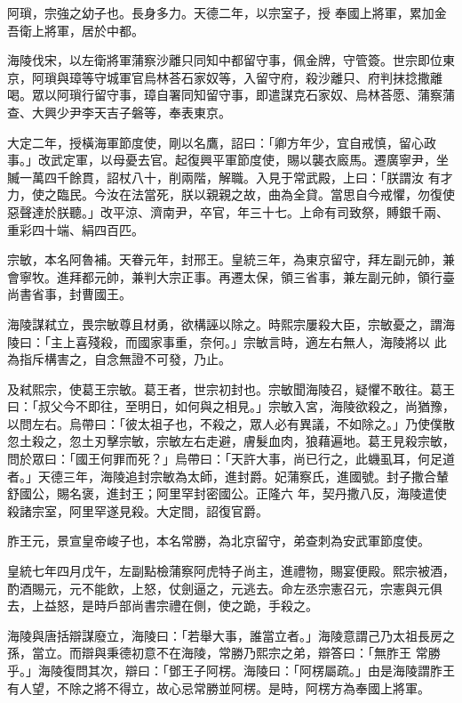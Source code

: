 \begin{pinyinscope}
 阿瑣，宗強之幼子也。長身多力。天德二年，以宗室子，授
 奉國上將軍，累加金吾衛上將軍，居於中都。



 海陵伐宋，以左衛將軍蒲察沙離只同知中都留守事，佩金牌，守管簽。世宗即位東京，阿瑣與璋等守城軍官烏林荅石家奴等，入留守府，殺沙離只、府判抹捻撒離喝。眾以阿瑣行留守事，璋自署同知留守事，即遣謀克石家奴、烏林荅愿、蒲察蒲查、大興少尹李天吉子磐等，奉表東京。



 大定二年，授橫海軍節度使，剛以名鷹，詔曰：「卿方年少，宜自戒慎，留心政事。」改武定軍，以母憂去官。起復興平軍節度使，賜以襲衣廄馬。遷廣寧尹，坐贓一萬四千餘貫，詔杖八十，削兩階，解職。入見于常武殿，上曰：「朕謂汝
 有才力，使之臨民。今汝在法當死，朕以親親之故，曲為全貸。當思自今戒懼，勿復使惡聲達於朕聽。」改平涼、濟南尹，卒官，年三十七。上命有司致祭，賻銀千兩、重彩四十端、絹四百匹。



 宗敏，本名阿魯補。天眷元年，封邢王。皇統三年，為東京留守，拜左副元帥，兼會寧牧。進拜都元帥，兼判大宗正事。再遷太保，領三省事，兼左副元帥，領行臺尚書省事，封曹國王。



 海陵謀弒立，畏宗敏尊且材勇，欲構誣以除之。時熙宗屢殺大臣，宗敏憂之，謂海陵曰：「主上喜殘殺，而國家事重，奈何。」宗敏言時，適左右無人，海陵將以
 此為指斥構害之，自念無證不可發，乃止。



 及弒熙宗，使葛王宗敏。葛王者，世宗初封也。宗敏聞海陵召，疑懼不敢往。葛王曰：「叔父今不即往，至明日，如何與之相見。」宗敏入宮，海陵欲殺之，尚猶豫，以問左右。烏帶曰：「彼太祖子也，不殺之，眾人必有異議，不如除之。」乃使僕散忽土殺之，忽土刃擊宗敏，宗敏左右走避，膚髮血肉，狼藉遍地。葛王見殺宗敏，問於眾曰：「國王何罪而死？」烏帶曰：「天許大事，尚已行之，此蟣虱耳，何足道者。」天德三年，海陵追封宗敏為太師，進封爵。妃蒲察氏，進國號。封子撒合輦舒國公，賜名褒，進封王；阿里罕封密國公。正隆六
 年，契丹撒八反，海陵遣使殺諸宗室，阿里罕遂見殺。大定間，詔復官爵。



 胙王元，景宣皇帝峻子也，本名常勝，為北京留守，弟查刺為安武軍節度使。



 皇統七年四月戊午，左副點檢蒲察阿虎特子尚主，進禮物，賜宴便殿。熙宗被酒，酌酒賜元，元不能飲，上怒，仗劍逼之，元逃去。命左丞宗憲召元，宗憲與元俱去，上益怒，是時戶部尚書宗禮在側，使之跪，手殺之。



 海陵與唐括辯謀廢立，海陵曰：「若舉大事，誰當立者。」海陵意謂己乃太祖長房之孫，當立。而辯與秉德初意不在海陵，常勝乃熙宗之弟，辯答曰：「無胙王
 常勝乎。」海陵復問其次，辯曰：「鄧王子阿楞。海陵曰：「阿楞屬疏。」由是海陵謂胙王有人望，不除之將不得立，故心忌常勝並阿楞。是時，阿楞方為奉國上將軍。




\end{pinyinscope}
